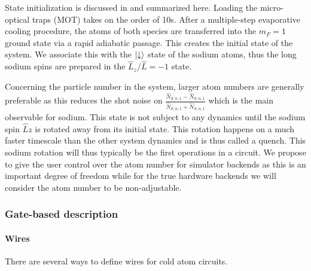 \documentclass[a4paper, 10pt]{article}
\begin{document}
    State initialization is discussed in \cite{mil2020experimental} and summarized here.
    Loading the micro-optical traps (MOT) takes on the order of 10s.
    After a multiple-step evaporative cooling procedure, the atoms of both species are transferred into the $m_F = 1$ ground state via a rapid adiabatic passage.
    This creates the initial state of the system.
    We associate this with the $\ket{\downarrow}$ state of the sodium atoms, thus the long sodium spins are prepared in the $\hat{L}_z/\hat{L} = -1$ state.
    
    Concerning the particle number in the system, larger atom numbers are generally preferable as this reduces the shot noise on $ \frac{\hat{N}_{S,n,1} - \hat{N}_{S,n,1}}{\hat{N}_{S,n,1} + \hat{N}_{S,n,1}}$ which is the main observable for sodium. 
    This state is not subject to any dynamics until the sodium spin $\hat{L}{z}$ is rotated away from its initial state.
    This rotation happens on a much faster timescale than the other system dynamics  and is thus called a quench.
    This sodium rotation will thus typically be the first operations in a circuit.
    We propose to give the user control over the atom number for simulator backends as this is an important degree of freedom while for the true hardware backends we will consider the atom number to be non-adjustable. 
        
    \subsubsection{Gate-based description}
        
    \paragraph{Wires}
    \label{sec:wires_mixtures}
    There are several ways to define wires for cold atom circuits.
        
\end{document}
